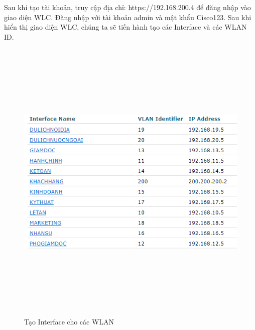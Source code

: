 \documentclass[a4paper, 12pt]{article}
\begin{document}
\hspace*{1cm}Sau khi tạo tài khoản, truy cập địa chỉ: https://192.168.200.4 để đăng nhập vào giao diện WLC. Đăng nhập với tài khoản admin và mật khẩu Cisco123. Sau khi hiển thị giao diện WLC, chúng ta sẽ tiến hành tạo các Interface và các WLAN ID.\\
\begin{figure}[H]
    \centering
    \includegraphics[width=16cm, height=14cm]{img/4.6c.png}
    \caption{Tạo Interface cho các WLAN}
    \label{hinh46c}
\end{figure}
\end{document}
